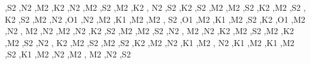 \begin{DoxyCompactItemize}
\textquotesingle{},\textquotesingle{}S2 \textquotesingle{},\textquotesingle{}N2 \textquotesingle{},\textquotesingle{}M2 \textquotesingle{},\textquotesingle{}K2 \textquotesingle{},\textquotesingle{}N2 \textquotesingle{},\textquotesingle{}M2 \textquotesingle{},\textquotesingle{}S2 \textquotesingle{},\textquotesingle{}M2 \textquotesingle{},\textquotesingle{}K2 \textquotesingle{}, \textquotesingle{}N2 \textquotesingle{},\textquotesingle{}S2 \textquotesingle{},\textquotesingle{}K2 \textquotesingle{},\textquotesingle{}S2 \textquotesingle{},\textquotesingle{}M2 \textquotesingle{},\textquotesingle{}M2 \textquotesingle{},\textquotesingle{}S2 \textquotesingle{},\textquotesingle{}K2 \textquotesingle{},\textquotesingle{}M2 \textquotesingle{},\textquotesingle{}S2 \textquotesingle{}, \textquotesingle{}K2 \textquotesingle{},\textquotesingle{}S2 \textquotesingle{},\textquotesingle{}M2 \textquotesingle{},\textquotesingle{}N2 \textquotesingle{},\textquotesingle{}O1 \textquotesingle{},\textquotesingle{}N2 \textquotesingle{},\textquotesingle{}M2 \textquotesingle{},\textquotesingle{}K1 \textquotesingle{},\textquotesingle{}M2 \textquotesingle{},\textquotesingle{}M2 \textquotesingle{}, \textquotesingle{}S2 \textquotesingle{},\textquotesingle{}O1 \textquotesingle{},\textquotesingle{}M2 \textquotesingle{},\textquotesingle{}K1 \textquotesingle{},\textquotesingle{}M2 \textquotesingle{},\textquotesingle{}S2 \textquotesingle{},\textquotesingle{}K2 \textquotesingle{},\textquotesingle{}O1 \textquotesingle{},\textquotesingle{}M2 \textquotesingle{},\textquotesingle{}N2 \textquotesingle{}, \textquotesingle{}M2 \textquotesingle{},\textquotesingle{}N2 \textquotesingle{},\textquotesingle{}M2 \textquotesingle{},\textquotesingle{}N2 \textquotesingle{},\textquotesingle{}K2 \textquotesingle{},\textquotesingle{}S2 \textquotesingle{},\textquotesingle{}M2 \textquotesingle{},\textquotesingle{}M2 \textquotesingle{},\textquotesingle{}S2 \textquotesingle{},\textquotesingle{}N2 \textquotesingle{}, \textquotesingle{}M2 \textquotesingle{},\textquotesingle{}N2 \textquotesingle{},\textquotesingle{}K2 \textquotesingle{},\textquotesingle{}M2 \textquotesingle{},\textquotesingle{}S2 \textquotesingle{},\textquotesingle{}M2 \textquotesingle{},\textquotesingle{}K2 \textquotesingle{},\textquotesingle{}M2 \textquotesingle{},\textquotesingle{}S2 \textquotesingle{},\textquotesingle{}N2 \textquotesingle{}, \textquotesingle{}K2 \textquotesingle{},\textquotesingle{}M2 \textquotesingle{},\textquotesingle{}S2 \textquotesingle{},\textquotesingle{}M2 \textquotesingle{},\textquotesingle{}S2 \textquotesingle{},\textquotesingle{}K2 \textquotesingle{},\textquotesingle{}M2 \textquotesingle{},\textquotesingle{}N2 \textquotesingle{},\textquotesingle{}K1 \textquotesingle{},\textquotesingle{}M2 \textquotesingle{}, \textquotesingle{}N2 \textquotesingle{},\textquotesingle{}K1 \textquotesingle{},\textquotesingle{}M2 \textquotesingle{},\textquotesingle{}K1 \textquotesingle{},\textquotesingle{}M2 \textquotesingle{},\textquotesingle{}S2 \textquotesingle{},\textquotesingle{}K1 \textquotesingle{},\textquotesingle{}M2 \textquotesingle{},\textquotesingle{}N2 \textquotesingle{},\textquotesingle{}M2 \textquotesingle{}, \textquotesingle{}M2 \textquotesingle{},\textquotesingle{}N2 \textquotesingle{},\textquotesingle{}S2 
\end{DoxyCompactItemize}
